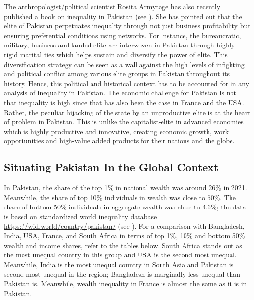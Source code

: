 \documentclass[12pt]{article}
\newcommand{\1}{\mathbbm 1}
\begin{document}
	
	
	
	
	
	
	The anthropologist/political scientist Rosita Armytage has also recently published a book on inequality in Pakistan (see \cite{armytage2020big}). She has pointed out that the elite of Pakistan perpetuates inequality through not just business profitability but ensuring preferential conditions using networks. For instance, the bureaucratic, military, business and landed elite are interwoven in Pakistan through highly rigid marital ties which helps sustain and diversify the power of elite. This diversification strategy can be seen as a wall against the high levels of infighting and political conflict among various elite groups in Pakistan throughout its history. Hence, this political and historical context has to be accounted for in any analysis of inequality in Pakistan. The economic challenge for Pakistan is not that inequality is high since that has also been the case in France and the USA. Rather, the peculiar hijacking of the state by an unproductive elite is at the heart of problem in Pakistan. This is unlike the capitalist-elite in advanced economies which is highly productive and innovative, creating economic growth, work opportunities and high-value added products for their nations and the globe.
	
	
	
	
	

     \subsection{Situating Pakistan In the Global Context}
	
	In Pakistan, the share of the top 1\% in national wealth was around 26\% in 2021. Meanwhile, the share of top 10\% individuals in wealth was close to 60\%. The share of bottom 50\% individuals in aggregate wealth was close to 4.6\%; the data is based on standardized world inequality database \url{https://wid.world/country/pakistan/} (see \cite{solt2016standardized}). For a comparison with Bangladesh, India, USA, France, and South Africa in terms of top 1\%, 10\% and bottom 50\% wealth and income shares, refer to the tables below. South Africa stands out as the most unequal country in this group and USA is the second most unequal. Meanwhile, India is the most unequal country in South Asia and Pakistan is second most unequal in the region; Bangladesh is marginally less unequal than Pakistan is. Meanwhile, wealth inequality in France is almost the same as it is in Pakistan. 
	
\end{document}
